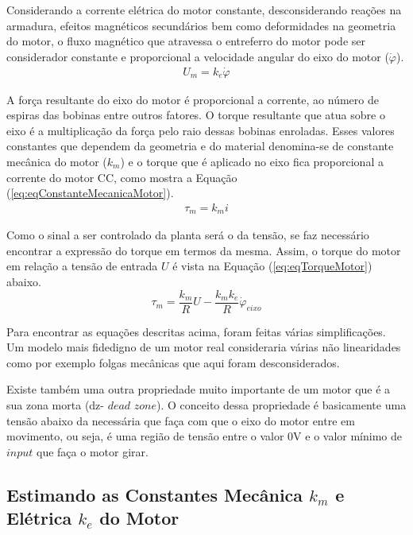 Considerando a corrente elétrica do motor constante, desconsiderando reações na armadura, efeitos magnéticos secundários bem como deformidades na geometria do motor, o fluxo magnético que atravessa o entreferro do motor pode ser considerador constante e proporcional a velocidade angular do eixo do motor ($\dot{\varphi}$).
\begin{gather}
	U_m = k_e\dot{\varphi}\label{eq:eqConstanteEletricaMotor}
\end{gather}

A força resultante do eixo do motor é proporcional a corrente, ao número de espiras das bobinas entre outros fatores. O torque resultante que atua sobre o eixo é a multiplicação da força pelo raio dessas bobinas enroladas. Esses valores constantes que dependem da geometria e do material denomina-se de constante mecânica do motor ($k_m$) e o torque que é aplicado no eixo fica proporcional a corrente do motor CC, como mostra a Equação (\ref{eq:eqConstanteMecanicaMotor}).
\begin{gather}
	\tau_{m} = k_mi\label{eq:eqConstanteMecanicaMotor}
\end{gather}

Como o  sinal a ser controlado da planta será o da tensão, se faz necessário encontrar a expressão do torque em termos da mesma. Assim, o torque do motor em relação a tensão de entrada $U$ é vista na Equação (\ref{eq:eqTorqueMotor}) abaixo.
\begin{equation}\label{eq:eqTorqueMotor}
    \tau_{m} = \dfrac{k_{m}}{R}U - \dfrac{k_{m}k_{e}}{R}\dot{\varphi}_{eixo}
\end{equation}

Para encontrar as equações descritas acima, foram feitas várias simplificações. Um modelo mais fidedigno de um motor real consideraria várias não linearidades como por exemplo folgas mecânicas que aqui foram desconsiderados. 

Existe também uma outra propriedade muito importante de um motor que é a sua zona morta (dz- $\textit{dead zone}$). O conceito dessa propriedade é basicamente uma tensão abaixo da necessária que faça com que o eixo do motor entre em movimento, ou seja, é uma região de tensão entre o valor 0V e o valor mínimo de $\textit{input}$ que faça o motor girar.

\subsection{Estimando as Constantes Mecânica $k_m$ e Elétrica $k_e$ do Motor}

